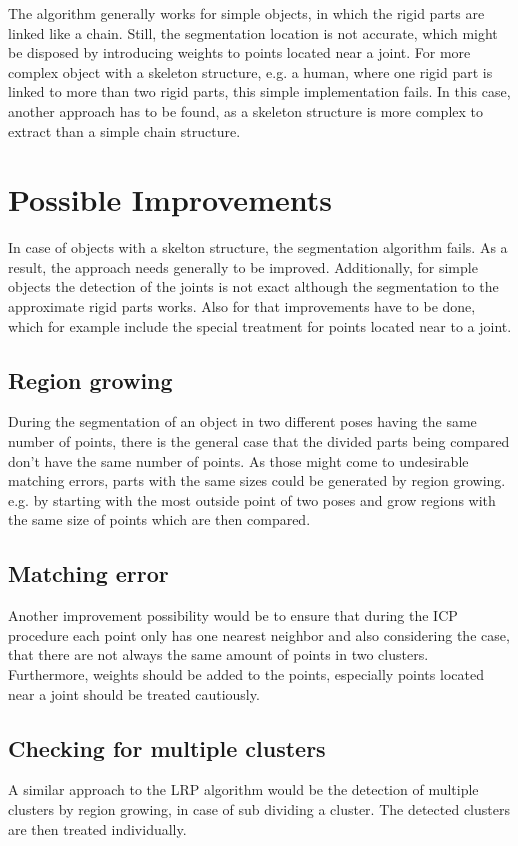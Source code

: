 The algorithm generally works for simple objects, in which the rigid parts are linked like a chain. Still, the segmentation location is not accurate, which might be disposed by introducing weights to points located near a joint. For more complex object with a skeleton structure, e.g. a human, where one rigid part is linked to more than two rigid parts, this simple implementation fails. In this case, another approach has to be found, as a skeleton structure is more complex to extract than a simple chain structure.

\section{Possible Improvements}

In case of objects with a skelton structure, the segmentation algorithm fails. As a result, the approach needs generally to be improved. Additionally, for simple objects the detection of the joints is not exact although the segmentation to the approximate rigid parts works. Also for that improvements have to be done, which for example include the special treatment for points located near to a joint.

\subsection{Region growing}
During the segmentation of an object in two different poses having the same number of points, there is the general case that the divided parts being compared don't have the same number of points. As those might come to undesirable matching errors, parts with the same sizes could be generated by region growing. e.g. by starting with the most outside point of two poses and grow regions with the same size of points which are then compared.

\subsection{Matching error}
Another improvement possibility would be to ensure that during the ICP procedure each point only has one nearest neighbor and also considering the case, that there are not always the same amount of points in two clusters. Furthermore, weights should be added to the points, especially points located near a joint should be treated cautiously. 

\subsection{Checking for multiple clusters}
A similar approach to the LRP algorithm \cite{guo2016correspondence} would be the detection of multiple clusters by region growing, in case of sub dividing a cluster. The detected clusters are then treated individually.

